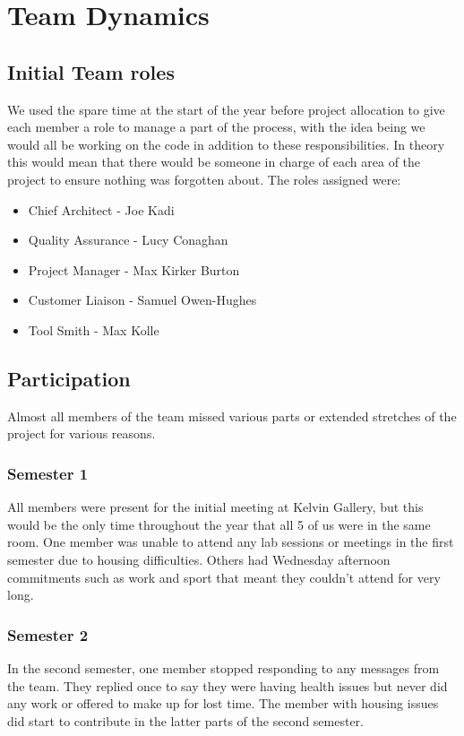 \documentclass{l3proj}
\begin{document}
\section{Team Dynamics}
\label{sec:team}

\subsection{Initial Team roles}
We used the spare time at the start of the year before project allocation to give each member a role to manage a part of the process, with the idea being we would all be working on the code in addition to these responsibilities. In theory this would mean that there would be someone in charge of each area of the project to ensure nothing was forgotten about.
The roles assigned were:
\begin{itemize}
    \item Chief Architect - Joe Kadi
    \item Quality Assurance - Lucy Conaghan
    \item Project Manager - Max Kirker Burton
    \item Customer Liaison - Samuel Owen-Hughes
    \item Tool Smith - Max Kolle
\end{itemize}


\subsection{Participation}
Almost all members of the team missed various parts or extended stretches of the project for various reasons.
\subsubsection{Semester 1}
All members were present for the initial meeting at Kelvin Gallery, but this would be the only time throughout the year that all 5 of us were in the same room. One member was unable to attend any lab sessions or meetings in the first semester due to housing difficulties. Others had Wednesday afternoon commitments such as work and sport that meant they couldn't attend for very long. 

\subsubsection{Semester 2}
In the second semester, one member stopped responding to any messages from the team. They replied once to say they were having health issues but never did any work or offered to make up for lost time. The member with housing issues did start to contribute in the latter parts of the second semester.
\end{document}
